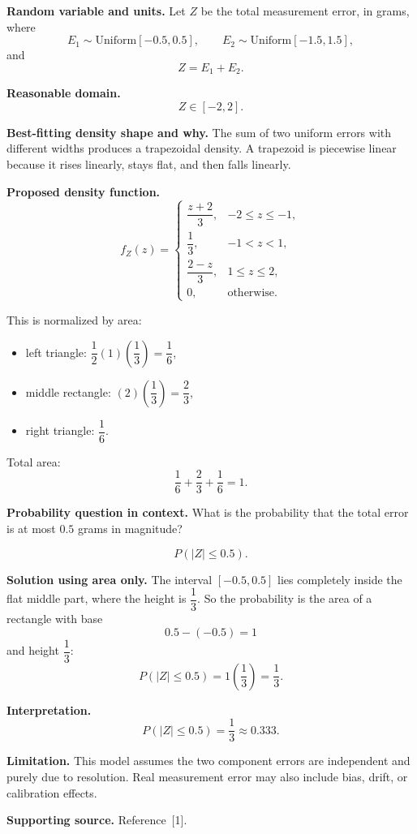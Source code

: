 \documentclass[11pt]{article}
\begin{document}
	\textbf{Random variable and units.} Let $Z$ be the total measurement error, in grams, where
	\[
	E_1\sim \text{Uniform}[-0.5,0.5],\qquad
	E_2\sim \text{Uniform}[-1.5,1.5],
	\]
	and
	\[
	Z=E_1+E_2.
	\]
	
	\textbf{Reasonable domain.}
	\[
	Z\in[-2,2].
	\]
	
	\textbf{Best-fitting density shape and why.} The sum of two uniform errors with different widths produces a trapezoidal density. A trapezoid is piecewise linear because it rises linearly, stays flat, and then falls linearly.
	
	\textbf{Proposed density function.}
	\[
	f_Z(z)=
	\begin{cases}
		\dfrac{z+2}{3}, & -2\le z\le -1,\\[6pt]
		\dfrac{1}{3}, & -1<z<1,\\[6pt]
		\dfrac{2-z}{3}, & 1\le z\le 2,\\
		0, & \text{otherwise}.
	\end{cases}
	\]
	
	This is normalized by area:
	\begin{itemize}[leftmargin=*]
		\item left triangle: $\dfrac12(1)\left(\dfrac13\right)=\dfrac16$,
		\item middle rectangle: $(2)\left(\dfrac13\right)=\dfrac23$,
		\item right triangle: $\dfrac16$.
	\end{itemize}
	
	Total area:
	\[
	\frac16+\frac23+\frac16=1.
	\]
	
	\textbf{Probability question in context.} What is the probability that the total error is at most $0.5$ grams in magnitude?
	
	\[
	P(|Z|\le 0.5).
	\]
	
	\textbf{Solution using area only.} The interval $[-0.5,0.5]$ lies completely inside the flat middle part, where the height is $\dfrac13$. So the probability is the area of a rectangle with base
	\[
	0.5-(-0.5)=1
	\]
	and height $\dfrac13$:
	\[
	P(|Z|\le 0.5)=1\left(\frac13\right)=\frac13.
	\]
	
	\textbf{Interpretation.}
	\[
	P(|Z|\le 0.5)=\frac13\approx 0.333.
	\]
	
	\textbf{Limitation.} This model assumes the two component errors are independent and purely due to resolution. Real measurement error may also include bias, drift, or calibration effects.
	
	\textbf{Supporting source.} Reference \,[1].
	
\end{document}

